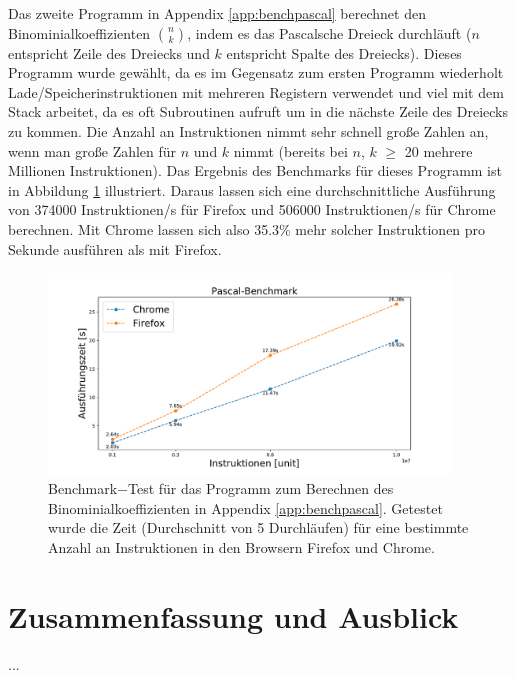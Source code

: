 \documentclass[a4paper, 11pt, onecolumn]{article}
\begin{document}
Das zweite Programm in Appendix \ref{app:benchpascal} berechnet den Binominialkoeffizienten ${n}\choose{k}$, indem es das Pascalsche Dreieck durchläuft ($n$ entspricht Zeile des Dreiecks und $k$ entspricht Spalte des Dreiecks). Dieses Programm wurde gewählt, da es im Gegensatz zum ersten Programm wiederholt Lade/Speicherinstruktionen mit mehreren Registern verwendet und viel mit dem Stack arbeitet, da es oft Subroutinen aufruft um in die nächste Zeile des Dreiecks zu kommen. Die Anzahl an Instruktionen nimmt sehr schnell große Zahlen an, wenn man große Zahlen für $n$ und $k$ nimmt (bereits bei $n$, $k$ $\geq$ 20 mehrere Millionen Instruktionen). Das Ergebnis des Benchmarks für dieses Programm ist in Abbildung \ref{fig:benchmarkPascal} illustriert. Daraus lassen sich eine durchschnittliche Ausführung von 374000 Instruktionen/s für Firefox und 506000 Instruktionen/s für Chrome berechnen. Mit Chrome lassen sich also 35.3\% mehr solcher Instruktionen pro Sekunde ausführen als mit Firefox.

\begin{figure}[!htb]
    \centering  
    \includegraphics[width=0.95\textwidth]{data/pascalBenchmark}
    \caption{Benchmark$-$Test für das Programm zum Berechnen des Binominialkoeffizienten in Appendix \ref{app:benchpascal}. Getestet wurde die Zeit (Durchschnitt von 5 Durchläufen) für eine bestimmte Anzahl an Instruktionen in den Browsern Firefox und Chrome.}
    \label{fig:benchmarkPascal}
\end{figure}

\newpage
\section{Zusammenfassung und Ausblick}

...




\appendix
\end{document}
